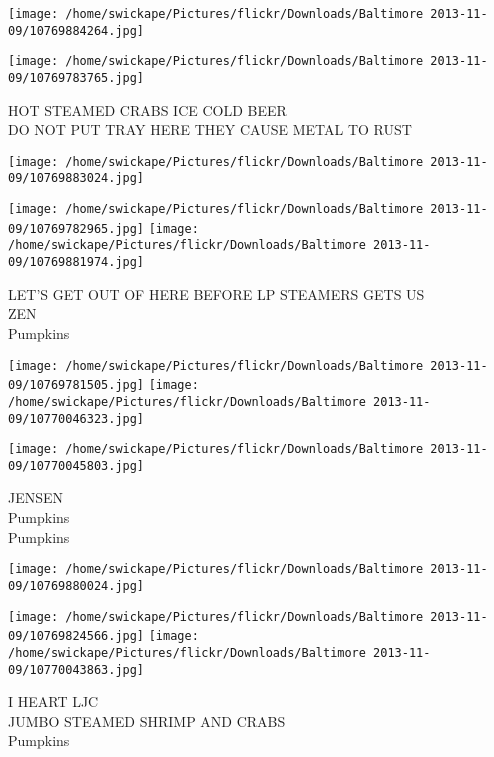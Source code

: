 \documentclass[10pt,letterpaper]{article}
\begin{document}
\texttt{[image: /home/swickape/Pictures/flickr/Downloads/Baltimore 2013-11-09/10769884264.jpg]}

\vspace{0.25in}
\texttt{[image: /home/swickape/Pictures/flickr/Downloads/Baltimore 2013-11-09/10769783765.jpg]}

HOT STEAMED CRABS ICE COLD BEER\\
DO NOT PUT TRAY HERE THEY CAUSE METAL TO RUST\\
\pagebreak

\texttt{[image: /home/swickape/Pictures/flickr/Downloads/Baltimore 2013-11-09/10769883024.jpg]}

\vspace{0.25in}
\texttt{[image: /home/swickape/Pictures/flickr/Downloads/Baltimore 2013-11-09/10769782965.jpg]}
\texttt{[image: /home/swickape/Pictures/flickr/Downloads/Baltimore 2013-11-09/10769881974.jpg]}

LET'S GET OUT OF HERE BEFORE LP STEAMERS GETS US\\
ZEN\\
Pumpkins\\
\pagebreak

\texttt{[image: /home/swickape/Pictures/flickr/Downloads/Baltimore 2013-11-09/10769781505.jpg]}
\texttt{[image: /home/swickape/Pictures/flickr/Downloads/Baltimore 2013-11-09/10770046323.jpg]}

\texttt{[image: /home/swickape/Pictures/flickr/Downloads/Baltimore 2013-11-09/10770045803.jpg]}

JENSEN\\
Pumpkins\\
Pumpkins\\
\pagebreak

\texttt{[image: /home/swickape/Pictures/flickr/Downloads/Baltimore 2013-11-09/10769880024.jpg]}

\vspace{0.25in}
\texttt{[image: /home/swickape/Pictures/flickr/Downloads/Baltimore 2013-11-09/10769824566.jpg]}
\texttt{[image: /home/swickape/Pictures/flickr/Downloads/Baltimore 2013-11-09/10770043863.jpg]}

I HEART LJC\\
JUMBO STEAMED SHRIMP AND CRABS\\
Pumpkins\\
\pagebreak
\end{document}
